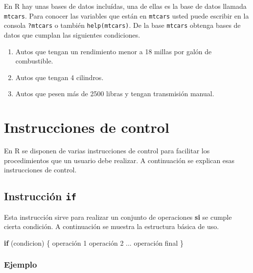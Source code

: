 \documentclass[
]{book}
\makeatletter
\newenvironment{Shaded}{\begin{snugshade}}{\end{snugshade}}
\newcommand{\ControlFlowTok}[1]{\textcolor[rgb]{0.13,0.29,0.53}{\textbf{#1}}}
\newcommand{\DecValTok}[1]{\textcolor[rgb]{0.00,0.00,0.81}{#1}}
\newcommand{\NormalTok}[1]{#1}
\providecommand{\tightlist}{%
  \setlength{\itemsep}{0pt}\setlength{\parskip}{0pt}}
\newenvironment{kframe}{%
\medskip{}
\setlength{\fboxsep}{.8em}
 \def\at@end@of@kframe{}%
 \ifinner\ifhmode%
  \def\at@end@of@kframe{\end{minipage}}%
  \begin{minipage}{\columnwidth}%
 \fi\fi%
 \def\FrameCommand##1{\hskip\@totalleftmargin \hskip-\fboxsep
 \colorbox{shadecolor}{##1}\hskip-\fboxsep
     \hskip-\linewidth \hskip-\@totalleftmargin \hskip\columnwidth}%
 \MakeFramed {\advance\hsize-\width
   \@totalleftmargin\z@ \linewidth\hsize
   \@setminipage}}%
 {\par\unskip\endMakeFramed%
 \at@end@of@kframe}
\renewenvironment{Shaded}{\begin{kframe}}{\end{kframe}}
\makeatother
\begin{document}
En R hay unas bases de datos incluídas, una de ellas es la base de datos llamada \texttt{mtcars}. Para conocer las variables que están en \texttt{mtcars} usted puede escribir en la consola \texttt{?mtcars} o también \texttt{help(mtcars)}. De la base \texttt{mtcars} obtenga bases de datos que cumplan las siguientes condiciones.

\begin{enumerate}
\def\labelenumi{\arabic{enumi}.}
\setcounter{enumi}{21}
\tightlist
\item
  Autos que tengan un rendimiento menor a 18 millas por galón de combustible.
\item
  Autos que tengan 4 cilindros.
\item
  Autos que pesen más de 2500 libras y tengan transmisión manual.
\end{enumerate}

\hypertarget{bucles}{%
\chapter{Instrucciones de control}\label{bucles}}

En R se disponen de varias instrucciones de control para facilitar los procedimientos que un usuario debe realizar. A continuación se explican esas instrucciones de control.

\hypertarget{instrucciuxf3n-if}{%
\section{\texorpdfstring{Instrucción \texttt{if}}{Instrucción if}}\label{instrucciuxf3n-if}}

Esta instrucción sirve para realizar un conjunto de operaciones \textbf{si} se cumple cierta condición. A continuación se muestra la estructura básica de uso.

\begin{Shaded}
\begin{Highlighting}[]
\ControlFlowTok{if}\NormalTok{ (condicion) \{}
\NormalTok{  operación }\DecValTok{1}
\NormalTok{  operación }\DecValTok{2}
\NormalTok{  ...}
\NormalTok{  operación final}
\NormalTok{\}}
\end{Highlighting}
\end{Shaded}

\hypertarget{ejemplo-15}{%
\subsection*{Ejemplo}\label{ejemplo-15}}
\end{document}
